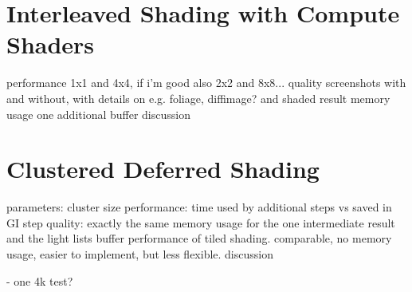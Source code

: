 

\section{Interleaved Shading with Compute Shaders}

\begin{outline}
\1 performance
\1 1x1 and 4x4, if i'm good also 2x2 and 8x8...
\1 quality
    \2 screenshots with and without, with details on e.g. foliage, diffimage? and shaded result
\1 memory usage
    \2 one additional buffer
\1 discussion

\end{outline}



\section{Clustered Deferred Shading}


\begin{outline}
\1 parameters: cluster size
\1 performance: time used by additional steps vs saved in GI step
\1 quality: exactly the same
\1 memory usage for the one intermediate result and the light lists buffer
\1 performance of tiled shading. comparable, no memory usage, easier to implement, but less flexible.
\1 discussion
\end{outline}




- one 4k test?
